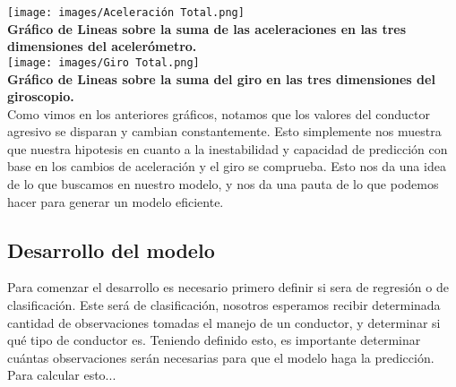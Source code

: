 \documentclass{article}
\begin{document}
        \texttt{[image: images/Aceleración Total.png]} \\

        \textbf{Gráfico de Lineas sobre la suma de las aceleraciones en las tres dimensiones del acelerómetro.} \\

        \texttt{[image: images/Giro Total.png]} \\

        \textbf{Gráfico de Lineas sobre la suma del giro en las tres dimensiones del giroscopio.} \\

        Como vimos en los anteriores gráficos, notamos que los valores del conductor agresivo se disparan y cambian constantemente. Esto simplemente nos muestra que nuestra hipotesis en cuanto a la inestabilidad y capacidad de predicción con base en los cambios de aceleración y el giro se comprueba. Esto nos da una idea de lo que buscamos en nuestro modelo, y nos da una pauta de lo que podemos hacer para generar un modelo eficiente.

    \subsection{Desarrollo del modelo}

        Para comenzar el desarrollo es necesario primero definir si sera de regresión o de clasificación. Este será de clasificación, nosotros esperamos recibir determinada cantidad de observaciones tomadas el manejo de un conductor, y determinar si qué tipo de conductor es. Teniendo definido esto, es importante determinar cuántas observaciones serán necesarias para que el modelo haga la predicción. Para calcular esto...

        
\end{document}
